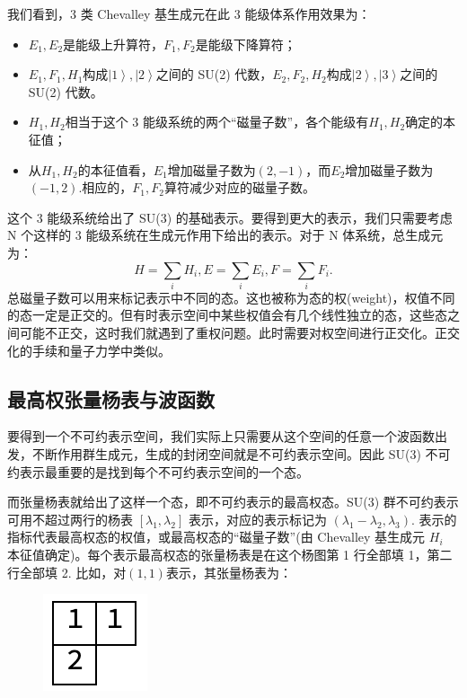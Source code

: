 \documentclass[UTF8]{ctexart}
\begin{document}
\noindent 我们看到，3 类 Chevalley 基生成元在此 3 能级体系作用效果为：
\begin{itemize}
	\item $E_1,E_2$是能级上升算符，$F_1,F_2$是能级下降算符；
	\item $E_1,F_1,H_1$构成$\left| 1 \right \rangle, \left| 2 \right \rangle$之间的 SU(2) 代数，$E_2,F_2,H_2$构成$\left| 2 \right \rangle, \left| 3 \right \rangle$之间的 SU(2) 代数。
	\item $H_1,H_2$相当于这个 3 能级系统的两个“磁量子数”，各个能级有$H_1, H_2$确定的本征值；
	\item 从$H_1,H_2$的本征值看，$E_1$增加磁量子数为$(2,-1)$，而$E_2$增加磁量子数为$(-1,2)$.相应的，$F_1,F_2$算符减少对应的磁量子数。
\end{itemize}
这个 3 能级系统给出了 SU(3) 的基础表示。要得到更大的表示，我们只需要考虑 N 个这样的 3 能级系统在生成元作用下给出的表示。对于 N 体系统，总生成元为：
\begin{equation}
	H = \sum_i H_i ,  E = \sum_i E_i ,  F = \sum_i F_i. 
\end{equation}
总磁量子数可以用来标记表示中不同的态。这也被称为态的权(weight)，权值不同的态一定是正交的。但有时表示空间中某些权值会有几个线性独立的态，这些态之间可能不正交，这时我们就遇到了重权问题。此时需要对权空间进行正交化。正交化的手续和量子力学中类似。
\subsection*{最高权张量杨表与波函数}
\noindent 要得到一个不可约表示空间，我们实际上只需要从这个空间的任意一个波函数出发，不断作用群生成元，生成的封闭空间就是不可约表示空间。因此 SU(3) 不可约表示最重要的是找到每个不可约表示空间的一个态。

而张量杨表就给出了这样一个态，即不可约表示的最高权态。SU(3) 群不可约表示可用不超过两行的杨表 $[\lambda_1, \lambda_2]$ 表示，对应的表示标记为 $(\lambda_1-\lambda_2,\lambda_3)$. 表示的指标代表最高权态的权值，或最高权态的“磁量子数”(由 Chevalley 基生成元 $H_i$ 本征值确定)。每个表示最高权态的张量杨表是在这个杨图第 1 行全部填 1，第二行全部填 2. 比如，对$(1,1)$表示，其张量杨表为：

\begin{figure}[H]
\begin{centering}
\includegraphics[width=0.1\linewidth]{include/Y1}
\par\end{centering}
\end{figure}
\end{document}
